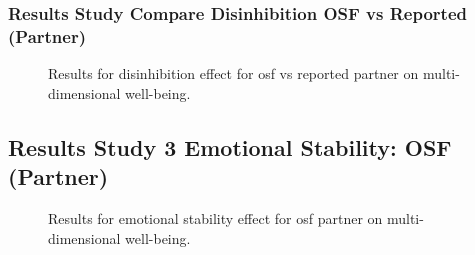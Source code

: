 \documentclass[
  singlecolumn]{article}
\begin{document}
\newpage{}

\subsubsection{Results Study Compare Disinhibition OSF vs Reported
(Partner)}\label{results-study-compare-disinhibition-osf-vs-reported-partner}

\begin{figure}


\caption{\label{fig-results-disinhibition-osf-compare}Results for
disinhibition effect for osf vs reported partner on multi-dimensional
well-being.}

\end{figure}%

\newpage{}

\subsection{Results Study 3 Emotional Stability: OSF
(Partner)}\label{results-study-3-emotional-stability-osf-partner}

\begin{figure}


\caption{\label{fig-results-emotional-partner-osf}Results for emotional
stability effect for osf partner on multi-dimensional well-being.}

\end{figure}%

\newpage{}
\end{document}
